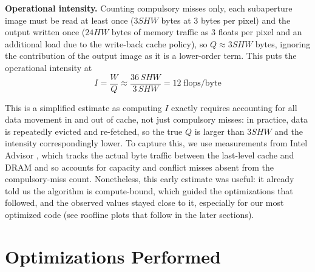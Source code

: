 \documentclass[letterpaper]{article}
\newcommand{\mypar}[1]{{\bf #1.}}
\begin{document}
\mypar{Operational intensity}
Counting compulsory misses only, each subaperture image must be read
at least once ($3SHW$ bytes at 3 bytes per pixel) and the output
written once ($24HW$ bytes of memory traffic as 3 floats per pixel and an additional load due to the write-back cache policy), so
$Q \approx 3SHW$ bytes, ignoring the contribution of the output image as it is a lower-order term. This puts the operational
intensity at
\begin{equation}
I = \frac{W}{Q} \approx \frac{36\,SHW}{3\,SHW} = 12
\;\text{flops/byte}
\end{equation}

This is a simplified estimate as computing $I$ exactly requires accounting for all data movement in and out of cache, not just compulsory misses: in practice, data is repeatedly evicted and re-fetched, so the true $Q$ is larger than $3SHW$ and the intensity correspondingly lower. To capture this, we use measurements from Intel Advisor \cite{inteladvisor}, which tracks the actual byte traffic between the last-level cache and DRAM and so accounts for capacity and conflict misses absent from the compulsory-miss count. 
Nonetheless, this early estimate was useful: it already told us the algorithm is compute-bound, which guided the optimizations that followed, and the observed values stayed close to it, especially for our most optimized code (see roofline plots that follow in the later sections).


\section{Optimizations Performed}\label{sec:yourmethod}


\end{document}
